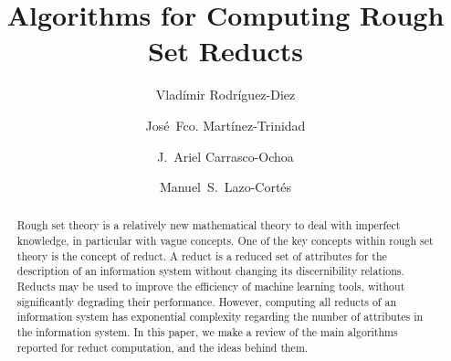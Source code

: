 \documentclass[citenumber]{llncs}
\begin{document}
\mainmatter              %
%
\title{Algorithms for Computing Rough Set Reducts}
%

\author{Vlad\'{i}mir Rodr\'{i}guez-Diez \and Jos\'{e}~Fco. Mart\'{i}nez-Trinidad
		 \and J.~Ariel Carrasco-Ochoa \and Manuel~S.~Lazo-Cortés}
%
%



\maketitle              %

%
\begin{abstract}
%
	Rough set theory is a relatively new mathematical theory to deal with imperfect knowledge, in particular with vague concepts. One of the key concepts within rough set theory is the concept of reduct. A reduct is a reduced set of attributes for the description of an information system without changing its discernibility relations. Reducts may be used to improve the efficiency of machine learning tools, without significantly degrading their performance. However, computing all reducts of an information system has exponential complexity regarding the number of attributes in the information system. In this paper, we make a review of the main algorithms reported for reduct computation, and the ideas behind them.
%
\end{abstract}
%

%
\end{document}
